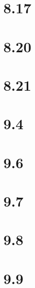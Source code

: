 \documentclass[12pt,a4paper]{article}
\begin{document}
\section{8.17}

\section{8.20}

\section{8.21}

\section{9.4}

\section{9.6}

\section{9.7}

\section{9.8}

\section{9.9}
\end{document}
